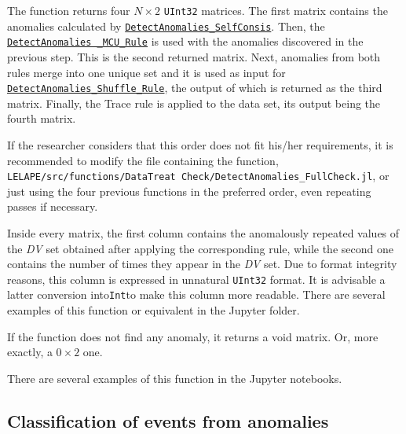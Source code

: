 \begin{itemize}
\begin{itemize}
 	\end{itemize}
 	
 	The function returns four \(N\times 2\) \texttt{UInt32} matrices. The first matrix contains the anomalies calculated by \hyperref[Fun:DetectAnomaliesSelfConsis]{\texttt{DetectAnomalies\_SelfConsis}}. Then, the \hyperref[Fun:DetectAnomaliesMCURule]{\texttt{DetectAnomalies \_MCU\_Rule}} is used with the anomalies discovered in the previous step. This is the second returned matrix. Next, anomalies from both rules merge into one unique set and it is used as input for \hyperref[Fun:DetectAnomaliesShuffleRule]{\texttt{DetectAnomalies\_Shuffle\_Rule}}, the output of which is returned as the third matrix. Finally, the Trace rule is applied to the data set, its output being the fourth matrix.
 	
 	If the researcher considers that this order does not fit his/her requirements, it is recommended to modify the file containing the function, \texttt{LELAPE/src/functions/DataTreat Check/DetectAnomalies\_FullCheck.jl}, or just using the four previous functions in the preferred order, even repeating passes if necessary.
 	
 	Inside every matrix, the first column contains the anomalously repeated values of the \textit{DV} set obtained after applying the corresponding rule, while the second one contains the number of times they appear in the \textit{DV} set. Due to format integrity reasons, this column is expressed in unnatural \texttt{UInt32} format.  	
 	It is advisable a latter conversion into\texttt{Int}to make this column more readable. There are several examples of this function or equivalent in the Jupyter folder.
 	
 	If the function does not find any anomaly, it returns a void matrix.  Or, more exactly, a \(0\times 2\) one. 
 	
 	There are several examples of this function in the Jupyter notebooks.
 \end{itemize}
 \subsection{Classification of events from anomalies}\label{SubSec:ClassificationEventsFromAnomalies}
